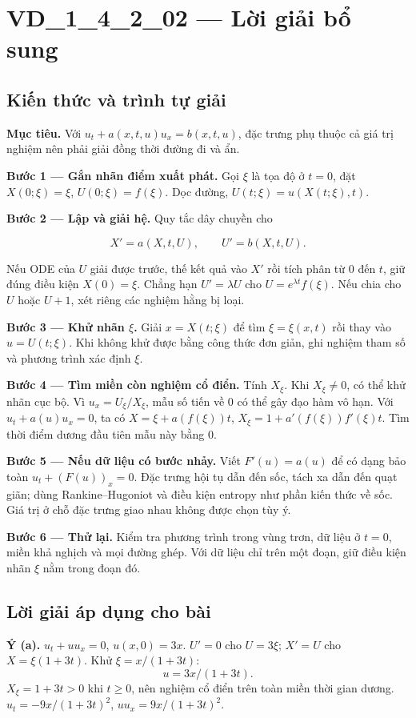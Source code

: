 \documentclass[10pt,a4paper]{article}
\begin{document}
\section*{VD\_1\_4\_2\_02 — Lời giải bổ sung}
\subsection*{Kiến thức và trình tự giải}
\textbf{Mục tiêu.} Với $u_t+a(x,t,u)u_x=b(x,t,u)$, đặc trưng phụ thuộc cả giá trị nghiệm nên phải giải đồng thời đường đi và ẩn.

\textbf{Bước 1 — Gắn nhãn điểm xuất phát.} Gọi $\xi$ là tọa độ ở $t=0$, đặt $X(0;\xi)=\xi$, $U(0;\xi)=f(\xi)$. Dọc đường, $U(t;\xi)=u(X(t;\xi),t)$.

\textbf{Bước 2 — Lập và giải hệ.} Quy tắc dây chuyền cho

\[
X'=a(X,t,U),\qquad U'=b(X,t,U).
\]

Nếu ODE của $U$ giải được trước, thế kết quả vào $X'$ rồi tích phân từ 0 đến $t$, giữ đúng điều kiện $X(0)=\xi$. Chẳng hạn $U'=\lambda U$ cho $U=e^{\lambda t}f(\xi)$. Nếu chia cho $U$ hoặc $U+1$, xét riêng các nghiệm hằng bị loại.

\textbf{Bước 3 — Khử nhãn $\xi$.} Giải $x=X(t;\xi)$ để tìm $\xi=\xi(x,t)$ rồi thay vào $u=U(t;\xi)$. Khi không khử được bằng công thức đơn giản, ghi nghiệm tham số và phương trình xác định $\xi$.

\textbf{Bước 4 — Tìm miền còn nghiệm cổ điển.} Tính $X_\xi$. Khi $X_\xi\ne0$, có thể khử nhãn cục bộ. Vì $u_x=U_\xi/X_\xi$, mẫu số tiến về 0 có thể gây đạo hàm vô hạn. Với $u_t+a(u)u_x=0$, ta có $X=\xi+a(f(\xi))t$, $X_\xi=1+a'(f(\xi))f'(\xi)t$. Tìm thời điểm dương đầu tiên mẫu này bằng 0.

\textbf{Bước 5 — Nếu dữ liệu có bước nhảy.} Viết $F'(u)=a(u)$ để có dạng bảo toàn $u_t+(F(u))_x=0$. Đặc trưng hội tụ dẫn đến sốc, tách xa dẫn đến quạt giãn; dùng Rankine–Hugoniot và điều kiện entropy như phần kiến thức về sốc. Giá trị ở chỗ đặc trưng giao nhau không được chọn tùy ý.

\textbf{Bước 6 — Thử lại.} Kiểm tra phương trình trong vùng trơn, dữ liệu ở $t=0$, miền khả nghịch và mọi đường ghép. Với dữ liệu chỉ trên một đoạn, giữ điều kiện nhãn $\xi$ nằm trong đoạn đó.
\subsection*{Lời giải áp dụng cho bài}
\textbf{Ý (a).} $u_t+uu_x=0$, $u(x,0)=3x$. $U'=0$ cho $U=3\xi$; $X'=U$ cho $X=\xi(1+3t)$. Khử $\xi=x/(1+3t)$:
\[u=3x/(1+3t).\]
$X_\xi=1+3t>0$ khi $t\ge0$, nên nghiệm cổ điển trên toàn miền thời gian dương. $u_t=-9x/(1+3t)^2$, $uu_x=9x/(1+3t)^2$.
\end{document}
